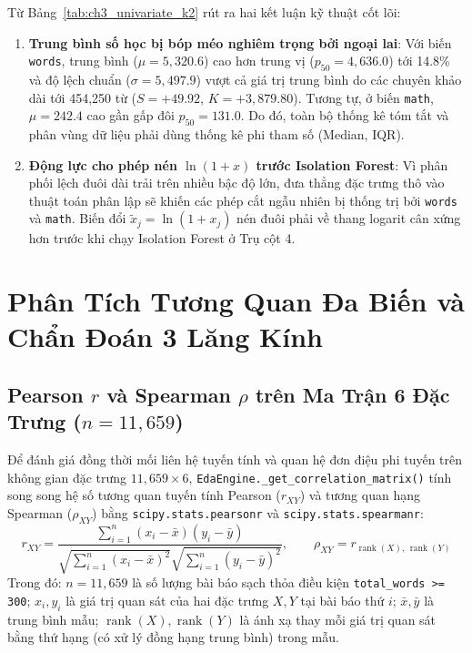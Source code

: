 Từ Bảng~\ref{tab:ch3_univariate_k2} rút ra hai kết luận kỹ thuật cốt lõi:
\begin{enumerate}[label=\textbf{\arabic*.}]
  \item \textbf{Trung bình số học bị bóp méo nghiêm trọng bởi ngoại lai}: Với biến \texttt{words}, trung bình ($\mu = 5,320.6$) cao hơn trung vị ($p_{50} = 4,636.0$) tới 14.8\% và độ lệch chuẩn ($\sigma = 5,497.9$) vượt cả giá trị trung bình do các chuyên khảo dài tới 454,250 từ ($S = +49.92$, $K = +3,879.80$). Tương tự, ở biến \texttt{math}, $\mu = 242.4$ cao gần gấp đôi $p_{50} = 131.0$. Do đó, toàn bộ thống kê tóm tắt và phân vùng dữ liệu phải dùng thống kê phi tham số (Median, IQR).
  \item \textbf{Động lực cho phép nén $\ln(1 + x)$ trước Isolation Forest}: Vì phân phối lệch đuôi dài trải trên nhiều bậc độ lớn, đưa thẳng đặc trưng thô vào thuật toán phân lập sẽ khiến các phép cắt ngẫu nhiên bị thống trị bởi \texttt{words} và \texttt{math}. Biến đổi $\tilde{x}_j = \ln(1 + x_j)$ nén đuôi phải về thang logarit cân xứng hơn trước khi chạy Isolation Forest ở Trụ cột 4.
\end{enumerate}

\FloatBarrier
\section{Phân Tích Tương Quan Đa Biến và Chẩn Đoán 3 Lăng Kính}
\label{sec:correlations}

\subsection{\texorpdfstring{Pearson $r$ và Spearman $\rho$ trên Ma Trận 6 Đặc Trưng ($n = 11,659$)}{Pearson r va Spearman rho tren Ma Tran 6 Dac Trung (n = 11,659)}}
\label{sec:ch3_pearson_spearman}

Để đánh giá đồng thời mối liên hệ tuyến tính và quan hệ đơn điệu phi tuyến trên không gian đặc trưng $11,659 \times 6$, \texttt{EdaEngine.\_get\_correlation\_matrix()} tính song song hệ số tương quan tuyến tính Pearson ($r_{XY}$) và tương quan hạng Spearman ($\rho_{XY}$) bằng \texttt{scipy.stats.pearsonr} và \texttt{scipy.stats.spearmanr}:
\begin{equation}
  r_{XY} = \frac{\sum_{i=1}^{n} (x_i - \bar{x})(y_i - \bar{y})}{\sqrt{\sum_{i=1}^{n} (x_i - \bar{x})^2} \sqrt{\sum_{i=1}^{n} (y_i - \bar{y})^2}},
  \qquad
  \rho_{XY} = r_{\operatorname{rank}(X),\, \operatorname{rank}(Y)}
  \label{eq:ch3_pearson_spearman}
\end{equation}
Trong đó: $n = 11,659$ là số lượng bài báo sạch thỏa điều kiện \texttt{total\_words >= 300}; $x_i, y_i$ là giá trị quan sát của hai đặc trưng $X, Y$ tại bài báo thứ $i$; $\bar{x}, \bar{y}$ là trung bình mẫu; $\operatorname{rank}(X), \operatorname{rank}(Y)$ là ánh xạ thay mỗi giá trị quan sát bằng thứ hạng (có xử lý đồng hạng trung bình) trong mẫu.

